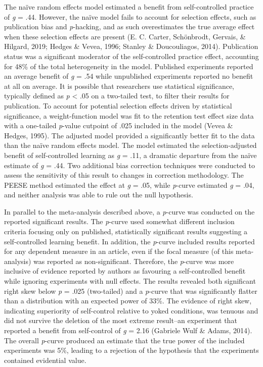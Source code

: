 \documentclass[
  english,
  man,floatsintext]{apa7}
\begin{document}
The naïve random effects model estimated a benefit from self-controlled practice of \emph{g} = .44. However, the naïve model fails to account for selection effects, such as publication bias and \emph{p}-hacking, and as such overestimates the true average effect when these selection effects are present (E. C. Carter, Schönbrodt, Gervais, \& Hilgard, 2019; Hedges \& Vevea, 1996; Stanley \& Doucouliagos, 2014). Publication status was a significant moderator of the self-controlled practice effect, accounting for 48\% of the total heterogeneity in the model. Published experiments reported an average benefit of \emph{g} = .54 while unpublished experiments reported no benefit at all on average. It is possible that researchers use statistical significance, typically defined as \emph{p} \textless{} .05 on a two-tailed test, to filter their results for publication. To account for potential selection effects driven by statistical significance, a weight-function model was fit to the retention test effect size data with a one-tailed \emph{p}-value cutpoint of .025 included in the model (Vevea \& Hedges, 1995). The adjusted model provided a significantly better fit to the data than the naïve random effects model. The model estimated the selection-adjusted benefit of self-controlled learning as \emph{g} = .11, a dramatic departure from the naïve estimate of \emph{g} = .44. Two additional bias correction techniques were conducted to assess the sensitivity of this result to changes in correction methodology. The PEESE method estimated the effect at \emph{g} = .05, while \emph{p}-curve estimated \emph{g} = .04, and neither analysis was able to rule out the null hypothesis.

In parallel to the meta-analysis described above, a \emph{p}-curve was conducted on the reported significant results. The \emph{p}-curve used somewhat different inclusion criteria focusing only on published, statistically significant results suggesting a self-controlled learning benefit. In addition, the \emph{p}-curve included results reported for any dependent measure in an article, even if the focal measure (of this meta-analysis) was reported as non-significant. Therefore, the \emph{p}-curve was more inclusive of evidence reported by authors as favouring a self-controlled benefit while ignoring experiments with null effects. The results revealed both significant right skew below \emph{p} = .025 (two-tailed) and a \emph{p}-curve that was significantly flatter than a distribution with an expected power of 33\%. The evidence of right skew, indicating superiority of self-control relative to yoked conditions, was tenuous and did not survive the deletion of the most extreme result--an experiment that reported a benefit from self-control of \emph{g} = 2.16 (Gabriele Wulf \& Adams, 2014). The overall \emph{p}-curve produced an estimate that the true power of the included experiments was 5\%, leading to a rejection of the hypothesis that the experiments contained evidential value.
\end{document}
